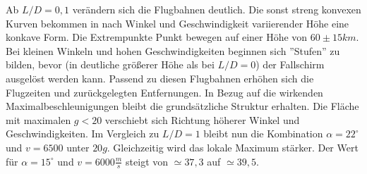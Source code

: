 Ab $L/D = 0,1$ verändern sich die Flugbahnen deutlich. Die sonst streng konvexen Kurven bekommen in nach Winkel und Geschwindigkeit variierender Höhe eine konkave Form. Die Extrempunkte Punkt bewegen auf einer Höhe von $60\pm 15km$. Bei kleinen Winkeln und hohen Ge\-schwin\-dig\-keit\-en beginnen sich ''Stufen'' zu bilden, bevor (in deutliche größerer Höhe als bei $L/D = 0$) der Fallschirm ausgelöst werden kann. Passend zu diesen Flugbahnen erhöhen sich die Flugzeiten und zurückgelegten Entfernungen. In Bezug auf die wirkenden Maximalbeschleunigungen bleibt die grundsätzliche Struktur erhalten. Die Fläche mit maximalen $g < 20$ verschiebt sich Richtung höherer Winkel und Geschwindigkeiten. Im Vergleich zu $L/D = 1$ bleibt nun die Kombination $\alpha = 22^{\circ}$ und $v = 6500$ unter $20g$. Gleichzeitig wird das lokale Maximum stärker. Der Wert für $\alpha = 15^{\circ}$ und $v = 6000 \frac{m}{s}$ steigt von $\simeq 37,3$ auf $\simeq 39,5$.

